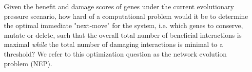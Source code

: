         Given the benefit and damage scores of genes under the current evolutionary pressure scenario, how hard of a computational problem would it be to determine the optimal immediate "next-move" for the system, i.e. which genes to conserve, mutate or delete, such that the overall total number of beneficial interactions is maximal \textit{while} the total number of damaging interactions is minimal to a threshold?
        We refer to this optimization question as the network evolution problem (NEP).

